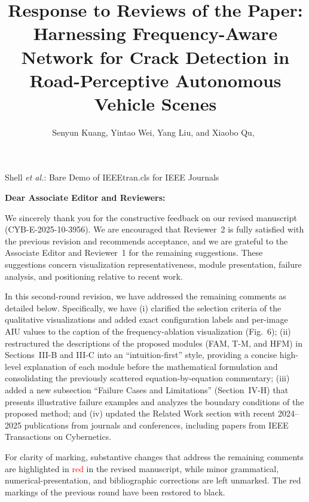 \documentclass[letterpaper,journal,onecolumn,12pt]{IEEEtran}
\begin{document}

\title{Response to Reviews of the Paper:\\
Harnessing Frequency-Aware Network for Crack Detection in Road-Perceptive Autonomous Vehicle Scenes}

\author{Senyun Kuang, Yintao Wei, Yang Liu, and Xiaobo Qu,~}

%
{Shell \MakeLowercase{\textit{et al.}}: Bare Demo of IEEEtran.cls for IEEE Journals}

\maketitle

\textbf{Dear Associate Editor and Reviewers:}

We sincerely thank you for the constructive feedback on our revised manuscript (CYB-E-2025-10-3956).
We are encouraged that Reviewer~2 is fully satisfied with the previous revision and recommends acceptance,
and we are grateful to the Associate Editor and Reviewer~1 for the remaining suggestions. These suggestions concern visualization representativeness, module presentation, failure analysis, and positioning relative to recent work.

In this second-round revision, we have addressed the remaining comments as detailed below. Specifically, we have
(i) clarified the selection criteria of the qualitative visualizations and added exact configuration labels and
per-image AIU values to the caption of the frequency-ablation visualization (Fig.~6);
(ii) restructured the descriptions of the proposed modules (FAM, T-M, and HFM) in Sections~III-B and III-C
into an ``intuition-first'' style, providing a concise high-level explanation of each module before the mathematical
formulation and consolidating the previously scattered equation-by-equation commentary;
(iii) added a new subsection ``Failure Cases and Limitations'' (Section~IV-H) that presents illustrative failure
examples and analyzes the boundary conditions of the proposed method; and
(iv) updated the Related Work section with recent 2024--2025 publications from journals and conferences,
including papers from IEEE Transactions on Cybernetics.

For clarity of marking, substantive changes that address the remaining comments are highlighted in
\textcolor{red}{red} in the revised manuscript, while minor grammatical, numerical-presentation, and bibliographic
corrections are left unmarked. The red markings of the previous round have been restored to black.
\end{document}
